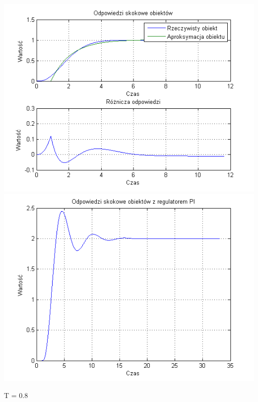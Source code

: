 \documentclass[10pt,a4paper]{article}
\begin{document}
\begin{center}
\includegraphics[scale=1]{images/jeden/skrypt_259.png}\\
\includegraphics[scale=1]{images/jeden/skrypt_260.png}\\
\end{center}
\newpage
T = 0.8
\end{document}

